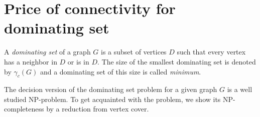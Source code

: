 \chapter{Price of connectivity for dominating set}\label{chap4}

\begin{defn}
A \emph{dominating set} of a graph \(G\) is a subset of vertices \(D\) such that every vertex has a neighbor in \(D\)
or is in \(D\).
The size of the smallest dominating set is denoted by \(\gamma_c(G)\) and a dominating set of this size is called \emph{minimum}.
\end{defn}

\begin{problem}
\end{problem}

The decision version of the dominating set problem for a given graph \(G\) is a well studied NP-problem. %
To get acquainted with the problem, we show its NP-completeness by a reduction from vertex cover.

